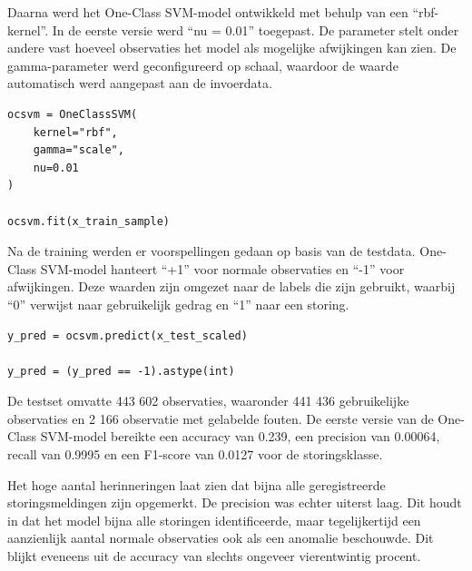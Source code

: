 {{{{{Daarna werd het One-Class SVM-model ontwikkeld met behulp van een ``rbf-kernel''. In de eerste versie werd ``nu = 0.01'' toegepast. De parameter stelt onder andere vast hoeveel observaties het model als mogelijke afwijkingen kan zien. De gamma-parameter werd geconfigureerd op schaal, waardoor de waarde automatisch werd aangepast aan de invoerdata.

\begin{listing}[H]
\begin{verbatim}
ocsvm = OneClassSVM(
    kernel="rbf",
    gamma="scale",
    nu=0.01
)

ocsvm.fit(x_train_sample)
\end{verbatim}
\caption[Code snippet: het trainen van het One-Class SVM-model op de MetroPT-3-dataset.]{Codefragment van het trainen van het One-Class SVM-model op de MetroPT-3-dataset.}
\end{listing} 
    
Na de training werden er voorspellingen gedaan op basis van de testdata. One-Class SVM-model hanteert ``+1'' voor normale observaties en ``-1'' voor afwijkingen. Deze waarden zijn omgezet naar de labels die zijn gebruikt, waarbij ``0'' verwijst naar gebruikelijk gedrag en ``1'' naar een storing.

\begin{listing}[H]
\begin{verbatim}
y_pred = ocsvm.predict(x_test_scaled)

y_pred = (y_pred == -1).astype(int)
\end{verbatim}
\caption[Code snippet: het voorspellen van afwijkingen met de One-Class SVM-model op de MetroPT-3-dataset.]{Codefragment van het voorspellen van afwijkingen met het One-Class SVM-model op de MetroPT-3-dataset.}
\end{listing} 

De testset omvatte 443 602 observaties, waaronder 441 436 gebruikelijke observaties en 2 166 observatie met gelabelde fouten. De eerste versie van de One-Class SVM-model bereikte een accuracy van 0.239, een precision van 0.00064, recall van 0.9995 en een F1-score van 0.0127 voor de storingsklasse.

Het hoge aantal herinneringen laat zien dat bijna alle geregistreerde storingsmeldingen zijn opgemerkt. De precision was echter uiterst laag. Dit houdt in dat het model bijna alle storingen identificeerde, maar tegelijkertijd een aanzienlijk aantal normale observaties ook als een anomalie beschouwde. Dit blijkt eveneens uit de accuracy van slechts ongeveer vierentwintig procent.

}}}}}
